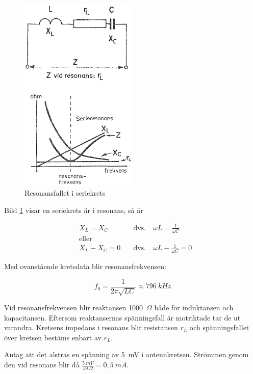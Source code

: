 \begin{figure}[ht]
\begin{center}
  \includegraphics[width=0.5\textwidth]{images/cropped_pdfs/bild_2_3-19.pdf}
  \caption{Resonansfallet i seriekrets}
  \label{fig:BildII3-19}
\end{center}
\end{figure}

Bild \ref{fig:BildII3-19} visar en seriekrets är i resonans, så är

\begin{align*}
& X_L = X_C \quad & \text{dvs.} \quad \omega L = \frac{1}{\omega C} \\
& \text{eller} & \\
& X_L - X_C = 0 \quad & \text{dvs.} \quad \omega L - \frac{1}{\omega C} = 0
\end{align*}

Med ovanstående kretsdata blir resonansfrekvensen:

\[
f_0 = \frac{1}{2\pi \sqrt{LC}} \approx 796\ kHz
\]

Vid resonansfrekvensen blir reaktansen 1000~\(\Omega\) både för induktansen och
kapacitansen.
Eftersom reaktansernas spänningsfall är motriktade tar de ut varandra.
Kretsens impedans i resonans blir resistansen \(r_L\) och
spänningsfallet över kretsen bestäms enbart av \(r_L\).

Antag att det alstras en spänning av 5~mV i antennkretsen.
Strömmen genom den vid resonans blir då \(\frac{5\ mV}{10\ \Omega} = 0,5\ mA\).

